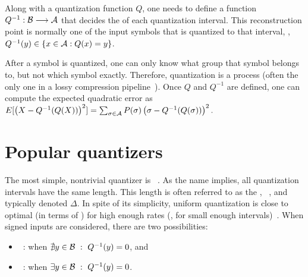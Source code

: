 Along with a quantization function $Q$, one needs to define a
\mbox{} function $Q^{-1}:\mathcal{B} \longrightarrow \mathcal{A}$
that decides the  of each quantization interval.
This reconstruction point is normally one of the input symbols that
is quantized to that interval, \ie, $Q^{-1}(y) \in \{x \in \mathcal{A} : Q(x) = y\}$.

After a symbol is quantized,
one can only know what group that symbol belongs to, but not which symbol exactly.
%
Therefore, quantization is a  process (often the only one in
a lossy compression pipeline~\cite[\S 3.1]{taubman2002jpeg2000}).
%
Once $Q$ and $Q^{-1}$ are defined, one can compute the expected quadratic error as
$
E[\left( X - Q^{-1}(Q(X))\right)^2] = \sum_{\sigma \in \mathcal{A}} P(\sigma) \left(\sigma - Q^{-1}(Q(\sigma))\right)^2.
$


\section{Popular quantizers}\label{sec:quantization:examples}

The most simple, nontrivial quantizer is ~\cite[\S 9.4]{sayood_introduction}.
As the name implies,
all quantization intervals have the same length. This length is often referred to as the ,
\aka\ , and typically denoted $\Delta$.
%
In spite of its simplicity, uniform quantization is close to optimal (in terms of )
for high enough rates (\ie, for small enough intervals)~\cite[\S 3.2.4, Fig.~3.5]{taubman2002jpeg2000}.
%
When signed inputs are considered, there are two possibilities:
\begin{itemize}
\item {}~\cite[Fig.~9.3]{sayood_introduction}: when $\nexists y \in \otheralphabet \ :\ Q^{-1}(y) = 0$, and
\item {}~\cite[Fig.~9.5]{sayood_introduction}: when $\exists y \in \otheralphabet \ :\ Q^{-1}(y) = 0$.
\end{itemize}

